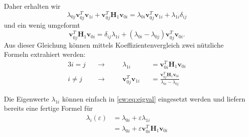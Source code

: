 Daher erhalten wir
\begin{equation}
    \lambda_{0j} \bm v_{0j}^T \bm v_{1i} + 
    \bm v_{0j}^T \bm H_1 \bm v_{0i}
    =
    \lambda_{0i} \bm v_{0j}^T \bm v_{1i} +
    \lambda_{1i} \delta_{ij}
\end{equation}
und ein wenig umgeformt
\begin{equation}
    \bm v_{0j}^T \bm H_1 \bm v_{0i}
    =
    \delta_{ij} \lambda_{1i} + 
    ( \lambda_{0i} - \lambda_{0j} )
    \bm v_{0j}^T  \bm v_{0i} .
\end{equation} \label{ew:eq:f}
Aus dieser Gleichung können mittels Koeffizientenvergleich zwei nützliche Formeln extrahiert werden:
\begin{alignat}{3}
    i = j \quad & \rightarrow  \quad && \lambda_{1i}&& = \bm v_{0i}^T \bm H_1 \bm v_{0i} \\
    i \neq j \quad & \rightarrow \quad && \bm v_{0j}^T \bm v_{1i}&& = \frac{\bm v_{0j}^T \bm H_1 \bm v_{0i}}{\lambda_{0i} - \lambda_{0j}}  \label{ew:eq:f2}
\end{alignat}

Die Eigenwerte $\lambda_{1i}$ können einfach in \ref{ew:eq:eigval} eingesetzt werden und liefern bereits eine fertige Formel für   
\begin{align*}
    \lambda_i(\varepsilon)
    &=
    \lambda_{0i} + \varepsilon \lambda_{1i} \\
    &=
    \lambda_{0i} + \varepsilon \bm v_{0i}^T \bm H_1 \bm v_{0i}
\end{align*}

